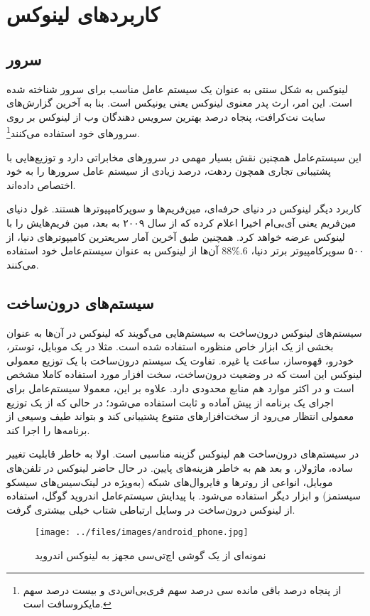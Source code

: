 \section{کاربردهای لینوکس}
\subsection*{سرور}
لینوکس به شکل سنتی به عنوان یک سیستم عامل مناسب برای سرور شناخته شده است. این امر، ارث پدر معنوی لینوکس یعنی یونیکس است. بنا به آخرین گزارش‌های سایت نت‌کرافت، پنجاه درصد بهترین سرویس دهندگان وب از لینوکس بر روی سرورهای خود استفاده می‌کنند\footnote{ از پنجاه درصد باقی مانده سی درصد سهم فری‌بی‌اس‌دی و بیست درصد سهم مایکروسافت است.}.

این سیستم‌عامل همچنین نقش بسیار مهمی در سرورهای مخابراتی دارد و توزیع‌هایی با پشتیبانی تجاری همچون ردهت، درصد زیادی از سیستم عامل سرورها را به خود اختصاص داده‌اند.

کاربرد دیگر لینوکس در دنیای حرفه‌ای، مین‌فریم‌ها و سوپرکامپیوترها هستند. غول دنیای مین‌فریم یعنی آی‌بی‌ام اخیرا اعلام کرده که از سال ۲۰۰۹ به بعد، مین فریم‌هایش را با لینوکس عرضه خواهد کرد. همچنین طبق آخرین آمار سریعترین کامیپوترهای دنیا، از ۵۰۰ سوپرکامپیوتر برتر دنیا،
6.\%88
آن‌ها از لینوکس به عنوان سیستم‌عامل خود استفاده می‌کنند.
\subsection*{سیستم‌های درون‌ساخت}
سیستم‌های لینوکس درون‌ساخت
به سیستم‌هایی می‌گویند که لینوکس در آن‌ها به عنوان بخشی از یک ابزار خاص منظوره استفاده شده است. مثلا در یک موبایل، توستر، خودرو، قهوه‌ساز، ساعت یا غیره. تفاوت یک سیستم درون‌ساخت با یک توزیع معمولی لینوکس این است که در وضعیت درون‌ساخت، سخت افزار مورد استفاده کاملا مشخص است و در اکثر موارد هم منابع محدودی دارد. علاوه بر این، معمولا سیستم‌عامل برای اجرای یک برنامه از پیش آماده و ثابت استفاده می‌شود؛ در حالی که از یک توزیع معمولی انتظار می‌رود از سخت‌افزارهای متنوع پشتیبانی کند و بتواند طیف وسیعی از برنامه‌ها را اجرا کند.

در سیستم‌های درون‌ساخت هم لینوکس گزینه مناسبی است. اولا به خاطر قابلیت تغییر ساده، ماژولار، و بعد هم به خاطر هزینه‌های پایین. در حال حاضر لینوکس در تلفن‌های موبایل، انواعی از روترها و فایروال‌های شبکه (به‌ویژه در لینک‌سیس‌های سیسکو سیستمز) و ابزار دیگر استفاده می‌شود. با پیدایش سیستم‌عامل اندروید گوگل، استفاده از لینوکس درون‌ساخت در وسایل ارتباطی شتاب خیلی بیشتری گرفت.
\begin{figure}[h]
\texttt{[image: ../files/images/android\_phone.jpg]}
\caption*{نمونه‌ای از یک گوشی اچ‌تی‌سی مجهز به لینوکس اندروید}
\end{figure}
